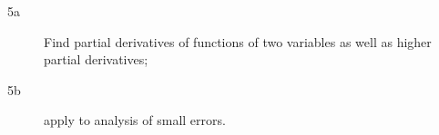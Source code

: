 
\begin{description}

\item[5a] Find partial derivatives of functions of two variables as well as higher partial derivatives; 
\item[5b] apply to analysis of small errors.
\end{description}

